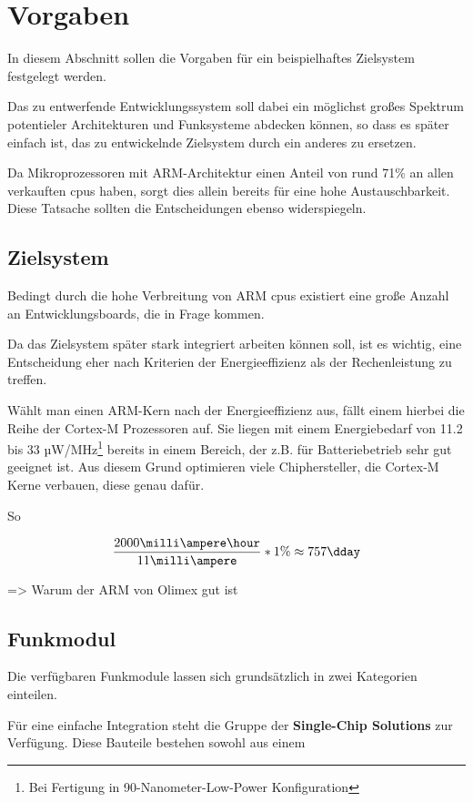 \section{Vorgaben} In diesem Abschnitt sollen die Vorgaben für ein
beispielhaftes Zielsystem festgelegt werden. 

Das zu entwerfende Entwicklungssystem soll dabei ein möglichst großes Spektrum
potentieler Architekturen und Funksysteme abdecken können, so dass es später
einfach ist, das zu entwickelnde Zielsystem durch ein anderes zu ersetzen.

Da Mikroprozessoren mit ARM-Architektur einen Anteil von rund 71\%\cite{IDC01}
an allen verkauften \glspl{cpu} haben, sorgt dies allein bereits für eine hohe
Austauschbarkeit. Diese Tatsache sollten die Entscheidungen ebenso
widerspiegeln.
\subsection{Zielsystem} Bedingt durch die hohe Verbreitung von ARM \glspl{cpu}
existiert eine große Anzahl an Entwicklungsboards, die in Frage kommen.

Da das Zielsystem später stark integriert arbeiten können soll, ist es wichtig,
eine Entscheidung eher nach Kriterien der Energieeffizienz als der
Rechenleistung zu treffen.

Wählt man einen ARM-Kern nach der Energieeffizienz aus, fällt einem hierbei die
Reihe der Cortex-M Prozessoren auf. Sie liegen mit einem Energiebedarf von
11.2 bis 33 µW/MHz\cite{ARM01}\footnote{Bei Fertigung in
90-Nanometer-Low-Power Konfiguration} bereits in einem Bereich, der z.B. für
Batteriebetrieb sehr gut geeignet ist. Aus diesem Grund optimieren viele
Chiphersteller, die Cortex-M Kerne verbauen, diese genau dafür.

So 

\begin{equation}\begin{split}
\frac{2000\milli\ampere\hour}{11 \milli\ampere}*1\% \approx 757 \dday
\end{split}\end{equation}

 => Warum der ARM von Olimex gut ist
\subsection{Funkmodul} Die verfügbaren Funkmodule lassen sich grundsätzlich in
zwei Kategorien einteilen.

Für eine einfache Integration steht die Gruppe der \textbf{Single-Chip
Solutions} zur Verfügung. Diese Bauteile bestehen sowohl aus einem  


